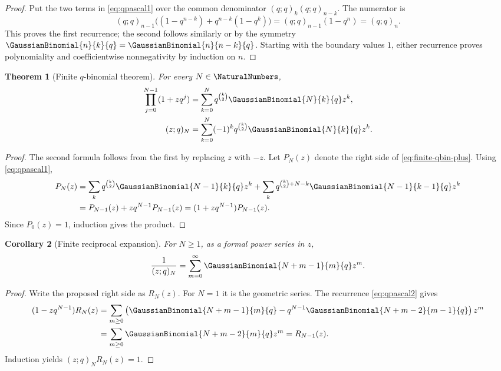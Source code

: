 \documentclass[11pt]{article}
\theoremstyle{blueplain}
\newtheorem{theorem}{Theorem}[section]
\newtheorem{corollary}[theorem]{Corollary}
\theoremstyle{bluedef}
\begin{document}
\begin{proof}
Put the two terms in \eqref{eq:qpascal1} over the common denominator $(q;q)_k(q;q)_{n-k}$. The numerator is
\[
(q;q)_{n-1}\bigl((1-q^{n-k})+q^{n-k}(1-q^k)\bigr)
=(q;q)_{n-1}(1-q^n)=(q;q)_n.
\]
This proves the first recurrence; the second follows similarly or by the symmetry $\GaussianBinomial{n}{k}{q}=\GaussianBinomial{n}{n-k}{q}$. Starting with the boundary values $1$, either recurrence proves polynomiality and coefficientwise nonnegativity by induction on $n$.
\end{proof}

\begin{theorem}[Finite $q$-binomial theorem]\label{thm:finite-qbinomial}
For every $N\in\NaturalNumbers$,
\begin{align}
\prod_{j=0}^{N-1}(1+zq^j)
 &=\sum_{k=0}^{N}q^{\binom{k}{2}}\GaussianBinomial{N}{k}{q} z^k, \label{eq:finite-qbin-plus}\\
(z;q)_N
 &=\sum_{k=0}^{N}(-1)^kq^{\binom{k}{2}}\GaussianBinomial{N}{k}{q} z^k. \label{eq:finite-qbin-minus}
\end{align}
\end{theorem}

\begin{proof}
The second formula follows from the first by replacing $z$ with $-z$. Let $P_N(z)$ denote the right side of \eqref{eq:finite-qbin-plus}. Using \eqref{eq:qpascal1},
\begin{align*}
P_N(z)
&=\sum_k q^{\binom{k}{2}}\GaussianBinomial{N-1}{k}{q}z^k
 +\sum_k q^{\binom{k}{2}+N-k}\GaussianBinomial{N-1}{k-1}{q}z^k\\
&=P_{N-1}(z)+zq^{N-1}P_{N-1}(z)
=(1+zq^{N-1})P_{N-1}(z).
\end{align*}
Since $P_0(z)=1$, induction gives the product.
\end{proof}

\begin{corollary}[Finite reciprocal expansion]\label{cor:finite-reciprocal}
For $N\ge1$, as a formal power series in $z$,
\[
\frac1{(z;q)_N}=\sum_{m=0}^{\infty}\GaussianBinomial{N+m-1}{m}{q}z^m.
\]
\end{corollary}

\begin{proof}
Write the proposed right side as $R_N(z)$. For $N=1$ it is the geometric series. The recurrence \eqref{eq:qpascal2} gives
\begin{align*}
(1-zq^{N-1})R_N(z)
&=\sum_{m\ge0}\left(\GaussianBinomial{N+m-1}{m}{q}-q^{N-1}\GaussianBinomial{N+m-2}{m-1}{q}\right)z^m\\
&=\sum_{m\ge0}\GaussianBinomial{N+m-2}{m}{q}z^m=R_{N-1}(z).
\end{align*}
Induction yields $(z;q)_NR_N(z)=1$.
\end{proof}
\end{document}
